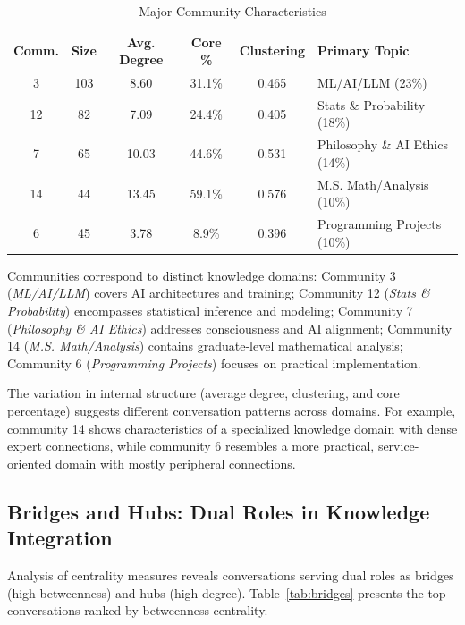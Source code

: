 \documentclass{svproc}
\begin{document}
\begin{table}
\centering
\caption{Major Community Characteristics}
\label{tab:communities}
\begin{tabular}{cccccl}
\toprule
\textbf{Comm.} & \textbf{Size} & \textbf{Avg. Degree} & \textbf{Core \%} & \textbf{Clustering} & \textbf{Primary Topic} \\
\midrule
3 & 103 & 8.60 & 31.1\% & 0.465 & ML/AI/LLM (23\%) \\
12 & 82 & 7.09 & 24.4\% & 0.405 & Stats \& Probability (18\%) \\
7 & 65 & 10.03 & 44.6\% & 0.531 & Philosophy \& AI Ethics (14\%) \\
14 & 44 & 13.45 & 59.1\% & 0.576 & M.S. Math/Analysis (10\%) \\
6 & 45 & 3.78 & 8.9\% & 0.396 & Programming Projects (10\%) \\
\bottomrule
\end{tabular}
\end{table}

Communities correspond to distinct knowledge domains: Community 3 (\emph{ML/AI/LLM}) covers AI architectures and training; Community 12 (\emph{Stats \& Probability}) encompasses statistical inference and modeling; Community 7 (\emph{Philosophy \& AI Ethics}) addresses consciousness and AI alignment; Community 14 (\emph{M.S. Math/Analysis}) contains graduate-level mathematical analysis; Community 6 (\emph{Programming Projects}) focuses on practical implementation.

The variation in internal structure (average degree, clustering, and core percentage) suggests different conversation patterns across domains. For example, community 14 shows characteristics of a specialized knowledge domain with dense expert connections, while community 6 resembles a more practical, service-oriented domain with mostly peripheral connections.

\subsection{Bridges and Hubs: Dual Roles in Knowledge Integration}

Analysis of centrality measures reveals conversations serving dual roles as bridges (high betweenness) and hubs (high degree). Table~\ref{tab:bridges} presents the top conversations ranked by betweenness centrality.
\end{document}
